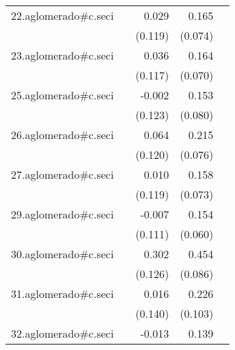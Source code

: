 {\begin{longtable}{l*{4}{D{.}{.}{-1}}}
\addlinespace
22.aglomerado#c.seci&                     &       0.029         &       0.165\sym{*}  &                     \\
            &                     &     (0.119)         &     (0.074)         &                     \\
\addlinespace
23.aglomerado#c.seci&                     &       0.036         &       0.164\sym{*}  &                     \\
            &                     &     (0.117)         &     (0.070)         &                     \\
\addlinespace
25.aglomerado#c.seci&                     &      -0.002         &       0.153         &                     \\
            &                     &     (0.123)         &     (0.080)         &                     \\
\addlinespace
26.aglomerado#c.seci&                     &       0.064         &       0.215\sym{**} &                     \\
            &                     &     (0.120)         &     (0.076)         &                     \\
\addlinespace
27.aglomerado#c.seci&                     &       0.010         &       0.158\sym{*}  &                     \\
            &                     &     (0.119)         &     (0.073)         &                     \\
\addlinespace
29.aglomerado#c.seci&                     &      -0.007         &       0.154\sym{*}  &                     \\
            &                     &     (0.111)         &     (0.060)         &                     \\
\addlinespace
30.aglomerado#c.seci&                     &       0.302\sym{*}  &       0.454\sym{***}&                     \\
            &                     &     (0.126)         &     (0.086)         &                     \\
\addlinespace
31.aglomerado#c.seci&                     &       0.016         &       0.226\sym{*}  &                     \\
            &                     &     (0.140)         &     (0.103)         &                     \\
\addlinespace
32.aglomerado#c.seci&                     &      -0.013         &       0.139         &                     \\

\end{longtable}}
